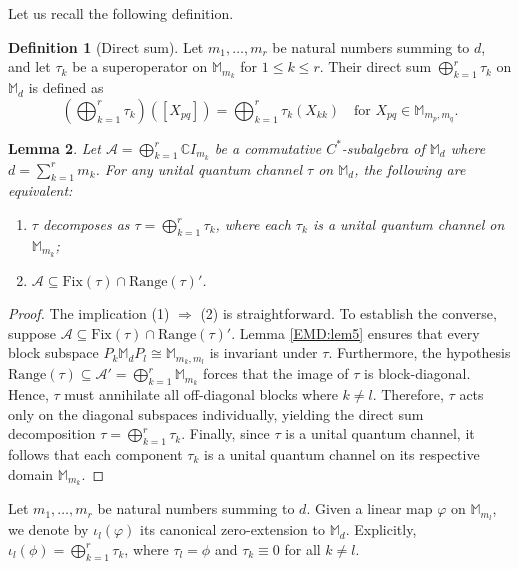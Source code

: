 \documentclass[11pt,reqno]{amsart}
\theoremstyle{definition}
\newtheorem{defn}{Definition}[section]
\theoremstyle{plain}
\newtheorem{lem}[defn]{Lemma}
\theoremstyle{remark}
\numberwithin{equation}{section}%
\begin{document}
Let us recall the following definition.


\begin{defn}[Direct sum]
	Let $m_1, \ldots, m_r$ be natural numbers summing to $d$, and let $\tau_k$ be a superoperator on $\mathbb{M}_{m_k}$ for $1 \le k \le r$. Their direct sum $\bigoplus_{k=1}^r \tau_k$ on $\mathbb{M}_d$ is defined as 
	\[\left(\bigoplus_{k=1}^r \tau_k\right)([X_{pq}]) = \bigoplus_{k=1}^r \tau_k(X_{kk}) \quad \text{for } X_{pq} \in \mathbb{M}_{m_p,m_q}.\] 
\end{defn}



\begin{lem}\label{EMD:lem1}
	Let $\mathcal{A} = \bigoplus_{k=1}^r \mathbb{C}I_{m_k}$ be a commutative $C^*$-subalgebra of $\mathbb{M}_d$ where $d = \sum_{k=1}^r m_k$. For any unital quantum channel $\tau$ on $\mathbb{M}_d$, the following are equivalent:
	\begin{enumerate}
		\item $\tau$ decomposes as $\tau = \bigoplus_{k=1}^r \tau_k$, where each $\tau_k$ is a unital quantum channel on $\mathbb{M}_{m_k}$;
		\item $\mathcal{A} \subseteq \text{Fix}(\tau) \cap \text{Range}(\tau)'$.
	\end{enumerate}
\end{lem}



\begin{proof}
	The implication (1) $\Rightarrow$ (2) is straightforward. To establish the converse, suppose $\mathcal{A} \subseteq \text{Fix}(\tau) \cap \text{Range}(\tau)'$. Lemma \ref{EMD:lem5} ensures that every block subspace $P_k \mathbb{M}_d P_l \cong \mathbb{M}_{m_k, m_l}$ is invariant under $\tau$. Furthermore, the hypothesis $\text{Range}(\tau) \subseteq \mathcal{A}' = \bigoplus_{k=1}^r \mathbb{M}_{m_k}$ forces that the image of $\tau$ is block-diagonal. Hence, $\tau$ must annihilate all off-diagonal blocks where $k \neq l$. Therefore, $\tau$ acts only on the diagonal subspaces individually, yielding the direct sum decomposition $\tau = \bigoplus_{k=1}^r \tau_k$. Finally, since $\tau$ is a unital quantum channel, it follows that each component $\tau_k$ is a unital quantum channel on its respective domain $\mathbb{M}_{m_k}$.
\end{proof}


    Let $m_1, \ldots, m_r$ be natural numbers summing to $d$. Given a linear map $\varphi$ on $\mathbb{M}_{m_l}$, we denote by $\iota_l(\varphi)$ its canonical zero-extension to $\mathbb{M}_d$. Explicitly, $\iota_l(\phi) = \bigoplus_{k=1}^r \tau_k$, where $\tau_l = \phi$ and $\tau_k \equiv 0$ for all $k \neq l$.
    
\end{document}
